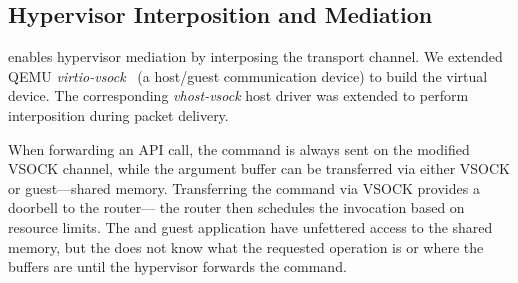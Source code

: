 

\subsection{Hypervisor Interposition and Mediation}
\label{s:impl_mediation}

\Model enables hypervisor mediation by interposing the transport channel.
We extended QEMU \emph{virtio-vsock}~\cite{virtio,virtio_vsock} (a
host/guest communication device) to build the virtual device.
The corresponding \emph{vhost-vsock} host driver was extended to perform interposition during packet delivery.

When forwarding an API call, the command is always sent on the modified VSOCK channel, while the argument buffer can be transferred via either VSOCK or guest---\worker shared memory.
Transferring the command via VSOCK provides a doorbell to the router---%
the router then schedules the invocation based on resource limits.
The \worker and guest application have unfettered access to the shared memory, but the \worker does not know what the requested operation is or where the buffers are until the hypervisor forwards the command.

